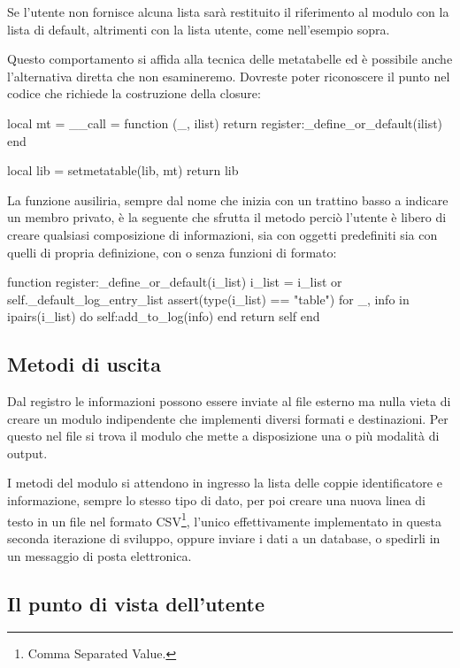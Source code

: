 Se l'utente non fornisce alcuna lista sarà restituito il riferimento al modulo
con la lista di default, altrimenti con la lista utente, come nell'esempio
sopra.

Questo comportamento si affida alla tecnica delle metatabelle ed è possibile
anche l'alternativa diretta che non esamineremo. Dovreste poter riconoscere il
punto nel codice che richiede la costruzione della closure:
\begin{lines}
local mt = {
    __call = function (_, ilist)
        return register:_define_or_default(ilist)
    end
}

local lib = {}
setmetatable(lib, mt)
return lib
\end{lines}

La funzione ausiliria, sempre dal nome che inizia con un trattino basso a
indicare un membro privato, è la seguente che sfrutta il metodo
 perciò l'utente è libero di creare qualsiasi composizione di
informazioni, sia con oggetti  predefiniti sia con quelli di propria
definizione, con o senza funzioni di formato:
\begin{lines}
function register:_define_or_default(i_list)
    i_list = i_list or self._default_log_entry_list
    assert(type(i_list) == "table")
    for _, info in ipairs(i_list) do
        self:add_to_log(info)
    end
    return self
end
\end{lines}


\subsection{Metodi di uscita}

Dal registro le informazioni possono essere inviate al file esterno ma nulla
vieta di creare un modulo indipendente che implementi diversi formati e
destinazioni. Per questo nel file  si trova il modulo
 che mette a disposizione una o più modalità di output.

I metodi del modulo si attendono in ingresso la lista delle coppie
identificatore e informazione, sempre lo stesso tipo di dato, per poi creare una
nuova linea di testo in un file nel formato CSV\footnote{Comma Separated
Value.}, l'unico effettivamente implementato in questa seconda iterazione di
sviluppo, oppure inviare i dati a un database, o spedirli in un messaggio di
posta elettronica.


\subsection{Il punto di vista dell'utente}


